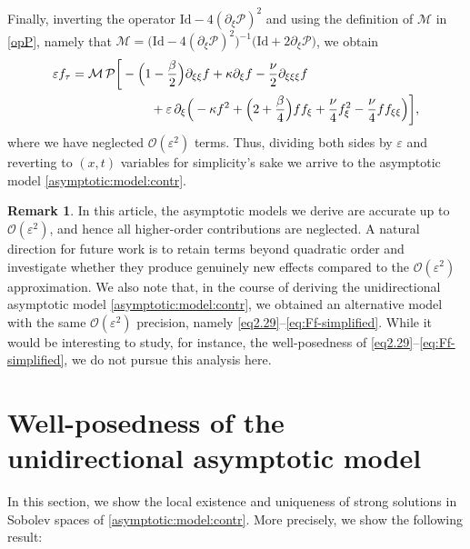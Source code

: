 \documentclass[reqno]{amsart}
\newcommand{\Id}{\mathrm{Id}}
\theoremstyle{definition}
\newtheorem{remark}[theorem]{Remark}
\numberwithin{equation}{section}
\numberwithin{theorem}{section}
\numberwithin{definition}{section}
\begin{document}
Finally, inverting the operator $\Id-4(\partial_\xi\mathcal P)^2$ and using the definition of $\mathcal M$ in \eqref{opP},
namely that $\mathcal M=\big(\Id-4(\partial_\xi\mathcal P)^2\big)^{-1}\big(\Id+2\partial_\xi\mathcal P\big)$, we obtain
\begin{align}\label{eq:MP-final}
\varepsilon f_\tau
&=\mathcal M\,\mathcal P\bigg[
- \Big(1-\frac{\beta}{2}\Big)\partial_{\xi\xi}f+\kappa\partial_{\xi}f-\frac{\nu}{2}\partial_{\xi\xi\xi}f \nonumber\\
&\hspace{2.2cm}
+\varepsilon\,\partial_\xi\Big(
-\kappa f^2+\Big(2+\frac{\beta}{4}\Big) f f_\xi
+\frac{\nu}{4}f_\xi^2-\frac{\nu}{4}f f_{\xi\xi}
\Big)\bigg],
\end{align}
where we have neglected $\mathcal O(\varepsilon^2)$ terms. Thus, dividing both sides by $\varepsilon$ and reverting to $(x,t)$ variables for simplicity's sake we arrive to the asymptotic model \eqref{asymptotic:model:contr}.
\begin{remark}
In this article, the asymptotic models we derive are accurate up to $\mathcal{O}(\varepsilon^2)$, and hence all higher-order contributions are neglected. A natural direction for future work is to retain terms beyond quadratic order and investigate whether they produce genuinely new effects compared to the $\mathcal{O}(\varepsilon^2)$ approximation. 
We also note that, in the course of deriving the unidirectional asymptotic model \eqref{asymptotic:model:contr}, we obtained an alternative model with the same $\mathcal{O}(\varepsilon^2)$ precision, namely \eqref{eq2.29}--\eqref{eq:Ff-simplified}. While it would be interesting to study, for instance, the well-posedness of \eqref{eq2.29}--\eqref{eq:Ff-simplified}, we do not pursue this analysis here.
\end{remark}



\section{Well-posedness of the unidirectional asymptotic model}\label{sec:wp}
In this section, we show the local existence and uniqueness of strong solutions in Sobolev spaces of \eqref{asymptotic:model:contr}. More precisely, we show the following result:
\end{document}
